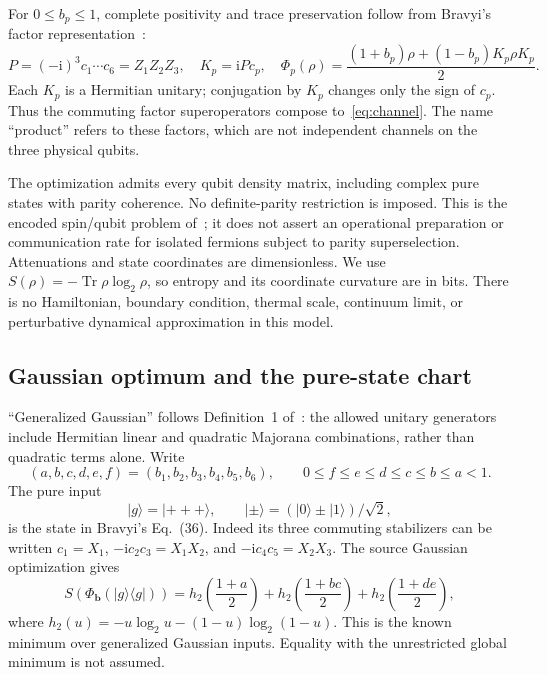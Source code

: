 \documentclass[11pt,a4paper]{article}
\newcommand{\ket}[1]{\lvert #1\rangle}
\newcommand{\bra}[1]{\langle #1\rvert}
\newcommand{\Tr}{\operatorname{Tr}}
\newcommand{\ii}{\mathrm{i}}
\newcommand{\PhiB}{\Phi_{\boldsymbol b}}
\begin{document}
For $0\le b_p\le1$, complete positivity and trace preservation follow
from Bravyi's factor representation~\cite[Eqs.~(9)--(10)]{Bravyi2005}:
\begin{equation}
 P=(-\ii)^3c_1\cdots c_6=Z_1Z_2Z_3,
 \quad K_p=\ii P c_p,
 \quad \Phi_p(\rho)=\frac{(1+b_p)\rho+(1-b_p)K_p\rho K_p}{2}.
 \label{eq:CP}
\end{equation}
Each $K_p$ is a Hermitian unitary; conjugation by $K_p$ changes only
the sign of $c_p$. Thus the commuting factor superoperators compose
to~\eqref{eq:channel}. The name ``product'' refers to these factors,
which are not independent channels on the three physical qubits.

The optimization admits every qubit density matrix, including complex
pure states with parity coherence. No definite-parity restriction is
imposed. This is the encoded spin/qubit problem of~\cite{Bravyi2005};
it does not assert an operational preparation or communication rate
for isolated fermions subject to parity superselection.
Attenuations and state coordinates are dimensionless. We use
$S(\rho)=-\Tr\rho\log_2\rho$, so entropy and its coordinate curvature
are in bits. There is no Hamiltonian, boundary condition, thermal scale,
continuum limit, or perturbative dynamical approximation in this model.

\subsection{Gaussian optimum and the pure-state chart}
``Generalized Gaussian'' follows Definition~1 of~\cite{Bravyi2005}:
the allowed unitary generators include Hermitian linear and quadratic
Majorana combinations, rather than quadratic terms alone. Write
\begin{equation}
 (a,b,c,d,e,f)=(b_1,b_2,b_3,b_4,b_5,b_6),\qquad
 0\le f\le e\le d\le c\le b\le a<1.\label{eq:chamber}
\end{equation}
The pure input
\begin{equation}
 \ket g=\ket{+++},\qquad
 \ket\pm=(\ket0\pm\ket1)/\sqrt2,\label{eq:g}
\end{equation}
is the state in Bravyi's Eq.~(36). Indeed its three commuting
stabilizers can be written $c_1=X_1$,
$-\ii c_2c_3=X_1X_2$, and $-\ii c_4c_5=X_2X_3$.
The source Gaussian optimization gives
\begin{equation}
 S(\PhiB(\ket g\bra g))=
 h_2\!\left(\frac{1+a}{2}\right)+
 h_2\!\left(\frac{1+bc}{2}\right)+
 h_2\!\left(\frac{1+de}{2}\right),\label{eq:known}
\end{equation}
where $h_2(u)=-u\log_2u-(1-u)\log_2(1-u)$.
This is the known minimum over generalized Gaussian inputs.
Equality with the unrestricted global minimum is not assumed.
\end{document}

